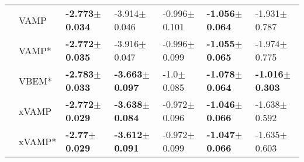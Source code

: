 \begin{tabular}{lllllll}
             & VAMP &  \textbf{-2.773$\pm$0.034} &           -3.914$\pm$0.046 &          -0.996$\pm$0.101 &  \textbf{-1.056$\pm$0.064} &           -1.931$\pm$0.787 \\
             & VAMP* &  \textbf{-2.772$\pm$0.035} &           -3.916$\pm$0.047 &          -0.996$\pm$0.099 &  \textbf{-1.055$\pm$0.065} &           -1.974$\pm$0.775 \\
             & VBEM* &  \textbf{-2.783$\pm$0.033} &  \textbf{-3.663$\pm$0.097} &            -1.0$\pm$0.085 &  \textbf{-1.078$\pm$0.064} &  \textbf{-1.016$\pm$0.303} \\
             & xVAMP &  \textbf{-2.772$\pm$0.029} &  \textbf{-3.638$\pm$0.084} &          -0.972$\pm$0.096 &  \textbf{-1.046$\pm$0.066} &           -1.638$\pm$0.592 \\
             & xVAMP* &   \textbf{-2.77$\pm$0.029} &  \textbf{-3.612$\pm$0.091} &          -0.972$\pm$0.099 &  \textbf{-1.047$\pm$0.066} &           -1.635$\pm$0.603 \\
\bottomrule
\end{tabular}

